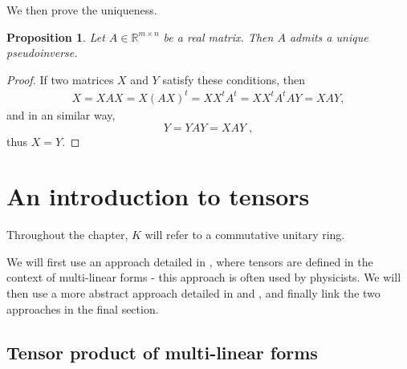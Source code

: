 \documentclass{report}
\newtheorem{prop}{Proposition}
\theoremstyle{definition}
\theoremstyle{remark}
\begin{document}
\medskip
We then prove the uniqueness.
 \begin{prop}
  Let $A \in \mathbb{R}^{m\times n}$ be a real matrix. Then $A$ admits a unique pseudoinverse.
 \end{prop}
\begin{proof}
If two matrices $X$ and $Y$ satisfy these conditions, then
\begin{equation*}
\begin{split}
        X = XAX = X(AX)^t = XX^tA^t = XX^tA^tAY = XAY ,
\end{split}
\end{equation*}
and in an similar way, 
$$Y=YAY=XAY\;,$$ 
thus $X=Y$.
\end{proof}


\chapter{An introduction to tensors}

Throughout the chapter, $K$ will refer to a commutative unitary ring. 

\bigskip

We will first use an approach detailed in \cite{Godement}, where tensors are defined in the context of multi-linear forms - this approach is often used by physicists. We will then use a more abstract approach detailed in \cite{Sage} and \cite{Rolland}, and finally link the two approaches in the final section. 



\section{Tensor product of multi-linear forms}
\end{document}
